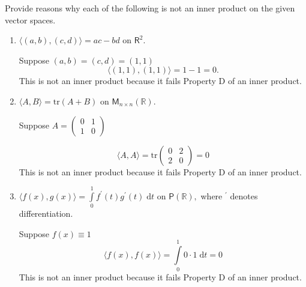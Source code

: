 Provide reasons why each of the following is not an inner product on
the given vector spaces.
\begin{enumerate}
\item $\langle(a,b),(c,d)\rangle = ac - bd$ on $\mathsf{R}^2.$

Suppose $(a,b) = (c,d) = (1,1)$
\begin{equation}
\langle (1,1),(1,1) \rangle = 1 - 1 = 0.
\end{equation}
This is not an inner product because it fails Property D of an inner
product.
\item $\langle A,B \rangle = \text{tr}(A+B)$ on $\mathsf{M}_{n\times
    n}(\mathbb{R}).$

Suppose $A = \left(\begin{smallmatrix} 0 & 1 \\ 1 &
    0\end{smallmatrix}\right)$

\begin{equation}
\langle A, A \rangle = \text{tr}\begin{pmatrix} 0  & 2 \\2 &
  0\end{pmatrix} = 0
\end{equation}
This is not an inner product because it fails Property D of an inner
product.
\item $\langle f(x),g(x) \rangle =
  \int\limits^1_0f^\prime(t)g^\prime(t) \; \mathrm{d}t$ on
  $\mathsf{P}(\mathbb{R}),$ where $^\prime$ denotes differentiation.

Suppose $f(x) \equiv 1$
\begin{equation}
\langle f(x),f(x) \rangle = \int\limits_0^1 0\cdot 1 \; \mathrm{d}t = 0
\end{equation}
This is not an inner product because it fails Property D of an inner
product.
\end{enumerate}
